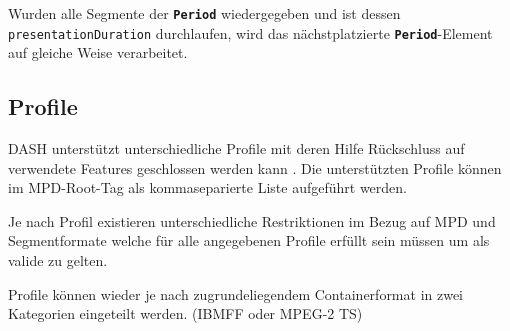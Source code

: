 \documentclass[paper = a4, fontsize = 12pt, parskip = half]{scrartcl} %
\def\attr#1{\texttt{#1}}
\def\elem#1{\texttt{\textbf{#1}}}
\begin{document}
Wurden alle Segmente der \elem{Period} wiedergegeben und ist dessen \attr{presentationDuration} durchlaufen, wird das nächstplatzierte \elem{Period}-Element auf gleiche Weise verarbeitet.

\subsection{Profile}
\label{profiles}
DASH unterstützt unterschiedliche Profile mit deren Hilfe Rückschluss auf verwendete Features geschlossen werden kann \cite{international_organization_for_standardization_isoiec_nodate}. Die unterstützten Profile können im MPD-Root-Tag als kommaseparierte Liste aufgeführt werden.

Je nach Profil existieren unterschiedliche Restriktionen im Bezug auf MPD und Segmentformate welche für alle angegebenen Profile erfüllt sein müssen um als valide zu gelten.

Profile können wieder je nach zugrundeliegendem Containerformat in zwei Kategorien eingeteilt werden. (IBMFF oder MPEG-2 TS)
\end{document}
